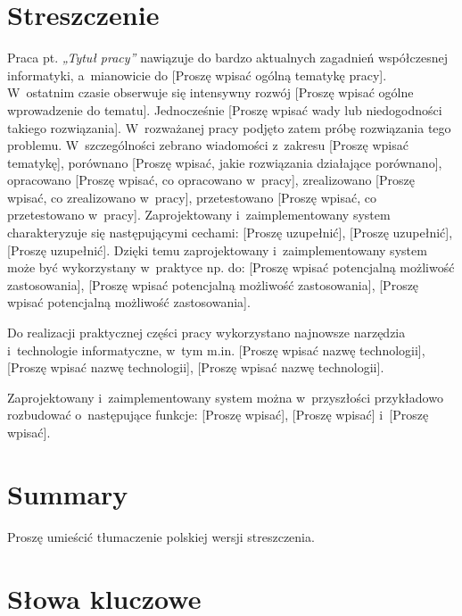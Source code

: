 \documentclass{PracaDyplomowa}
\begin{document}
\listoftables
{}

\lstlistoflistings
{}

\chapter*{Streszczenie}

Praca pt. \textit{„Tytuł pracy”} nawiązuje do bardzo aktualnych zagadnień współczesnej informatyki, a~mianowicie do [Proszę wpisać ogólną tematykę pracy]. W~ostatnim czasie obserwuje się intensywny rozwój [Proszę wpisać ogólne wprowadzenie do tematu]. Jednocześnie [Proszę wpisać wady lub niedogodności takiego rozwiązania]. W~rozważanej pracy podjęto zatem próbę rozwiązania tego problemu. W~szczególności zebrano wiadomości z~zakresu [Proszę wpisać tematykę], porównano [Proszę wpisać, jakie rozwiązania działające porównano], opracowano [Proszę wpisać, co opracowano w~pracy], zrealizowano [Proszę wpisać, co zrealizowano w~pracy], przetestowano [Proszę wpisać, co przetestowano w~pracy]. Zaprojektowany i~zaimplementowany system charakteryzuje się następującymi cechami: [Proszę uzupełnić], [Proszę uzupełnić], [Proszę uzupełnić]. Dzięki temu zaprojektowany i~zaimplementowany system może być wykorzystany w~praktyce np. do: [Proszę wpisać potencjalną możliwość zastosowania], [Proszę wpisać potencjalną możliwość zastosowania], [Proszę wpisać potencjalną możliwość zastosowania].

Do realizacji praktycznej części pracy wykorzystano najnowsze narzędzia i~technologie informatyczne, w~tym m.in. [Proszę wpisać nazwę technologii], [Proszę wpisać nazwę technologii], [Proszę wpisać nazwę technologii].

Zaprojektowany i~zaimplementowany system można w~przyszłości przykładowo rozbudować o~następujące funkcje: [Proszę wpisać], [Proszę wpisać] i~[Proszę wpisać].

\chapter*{Summary}

Proszę umieścić tłumaczenie polskiej wersji streszczenia.

\chapter*{Słowa kluczowe}
\end{document}
